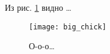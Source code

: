 \documentclass{article}
\begin{document}
Из рис. \ref{fig:chick} видно \dots
\begin{figure}
\centering
\texttt{[image: big\_chick]}
\caption{\label{fig:chick}О-о-о\dots}
\end{figure}
\end{document}
